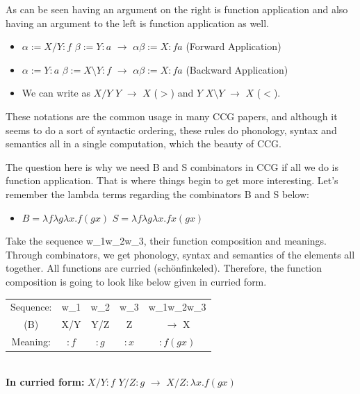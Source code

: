 \documentclass[12pt,a4paper]{article}
\begin{document}
As can be seen having an argument on the right is function application and also having an argument to the left is function application as well.
\begin{itemize}
\item[] $\alpha := X/Y:f$ $\beta :=Y:a$ $\rightarrow$ $\alpha\beta :=X:fa$ (Forward Application)
\item[] $\alpha := Y:a$ $\beta :=X\setminus Y:f$ $\rightarrow$ $\alpha\beta :=X:fa$ (Backward Application)
\item[] We can write as $X/Y$ $Y$ $\rightarrow$ $X$ ($>$) and $Y$ $X\setminus Y$ $\rightarrow$ $X$ ($<$).
\end{itemize}

These notations are the common usage in many CCG papers, and although it seems to do a sort of syntactic ordering, these rules do phonology, syntax and semantics all in a single computation, which the beauty of CCG.

The question here is why we need B and S combinators in CCG if all we do is function application. That is where things begin to get more interesting. Let's remember the lambda terms regarding the combinators B and S below:

\begin{itemize}
\item[] $B=\lambda f\lambda g\lambda x.f(gx)$ \hspace{1cm} $S=\lambda f\lambda g\lambda x.fx(gx)$
\end{itemize}

Take the sequence w_{1}w_{2}w_{3}, their function composition and meanings. Through combinators, we get phonology, syntax and semantics of the elements all together. All functions are curried (schönfinkeled). Therefore, the function composition is going to look like below given in curried form.\\

\begin{tabular}{ccccc}
Sequence: & w_{1} & w_{2} & w_{3} & w_{1}w_{2}w_{3} \\
    (B)   & X/Y   & Y/Z   & Z     & $\rightarrow$ X    \\
Meaning:        & $:f$    & $:g$    & $:x$    & $:f(gx)$ \\ \hline
\end{tabular}\\

\textbf{In curried form:} $X/Y:f$ $Y/Z:g$ $\rightarrow$ $X/Z:\lambda x.f(gx)$\\
\end{document}
